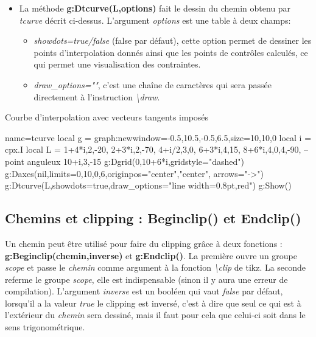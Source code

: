 \begin{itemize}
Deux points consécutifs seront reliés par une courbe de Bézier, la fonction calcule les points de contrôle pour avoir les vecteurs tangents souhaités.

\item La méthode \textbf{g:Dtcurve(L,options)} fait le dessin du chemin obtenu par \emph{tcurve} décrit ci-dessus. L'argument \emph{options} est une table à deux champs:
    \begin{itemize}
        \item \emph{showdots=true/false} (false par défaut), cette option permet de dessiner les points d'interpolation donnés ainsi que les points de contrôles calculés, ce qui permet une visualisation des contraintes.
        \item \emph{draw\_options=""}, c'est une chaîne de caractères qui sera passée directement à l'instruction \emph{\textbackslash draw}.
    \end{itemize}
\end{itemize}

\begin{demo}{Courbe d'interpolation avec vecteurs tangents imposés}
\begin{luadraw}{name=tcurve}
local g = graph:new{window={-0.5,10.5,-0.5,6.5},size={10,10,0}}
local i = cpx.I
local L = {
    1+4*i,{2,-20},
    2+3*i,{2,-70},
    4+i/2,{3,0},
    6+3*i,{4,15},
    8+6*i,{4,0,4,-90}, -- point anguleux
    10+i,{3,-15}}
g:Dgrid({0,10+6*i},{gridstyle="dashed"})
g:Daxes(nil,{limits={{0,10},{0,6}},originpos={"center","center"}, arrows="->"})
g:Dtcurve(L,{showdots=true,draw_options="line width=0.8pt,red"})
g:Show()
\end{luadraw}
\end{demo}

\subsection{Chemins et clipping : Beginclip() et Endclip()}

Un chemin peut être utilisé pour faire du clipping grâce à deux fonctions : \textbf{g:Beginclip(chemin,inverse)} et \textbf{g:Endclip()}. La première ouvre un groupe \emph{scope} et passe le \emph{chemin} comme argument à la fonction \emph{\textbackslash clip} de tikz. La seconde referme le groupe \emph{scope}, elle est indispensable (sinon il y aura une erreur de compilation).
L'argument \emph{inverse} est un booléen qui vaut \emph{false} par défaut, lorsqu'il a la valeur \emph{true} le clipping est inversé, c'est à dire que seul ce qui est à l'extérieur du \emph{chemin} sera dessiné, mais il faut pour cela que celui-ci soit dans le sens trigonométrique.


